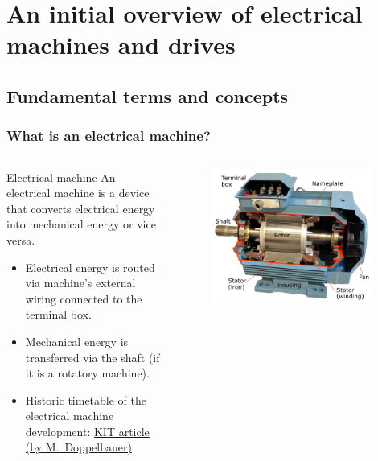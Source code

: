 \section{An initial overview of electrical machines and drives}

\subsection{Fundamental terms and concepts}

\begin{frame}
	\frametitle{What is an electrical machine?}
	\begin{columns}
		\begin{column}{0.5\textwidth}
			\begin{varblock}{Electrical machine}
				An electrical machine is a device that converts electrical energy into  mechanical energy or vice versa.
			\end{varblock}
			\vspace{0.25cm}
			\begin{itemize}
				\item<2-> Electrical energy is routed via machine's external wiring connected to the terminal box.
				\item<3-> Mechanical energy is transferred via the shaft (if it is a rotatory machine).
				\item<4-> Historic timetable of the electrical machine development: \href{https://www.eti.kit.edu/english/1376.php}{KIT article (by M.~Doppelbauer)}
			\end{itemize}
		\end{column}
		\begin{column}{0.5\textwidth}
			\begin{figure}
				\centering
				\includegraphics[width=0.95\textwidth]{fig/lec01/Induction_machine_opened.pdf}

\end{figure}
\end{column}
\end{columns}
\end{frame}
